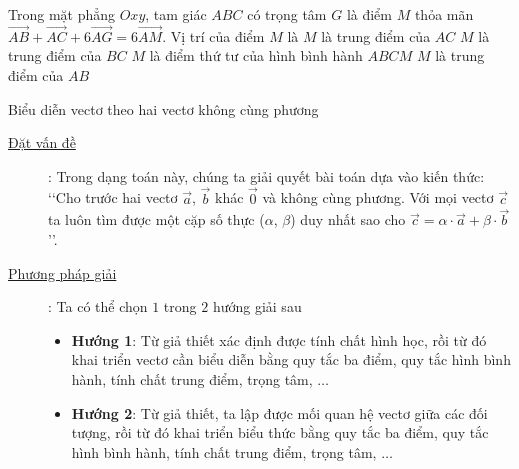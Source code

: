 \begin{ex}%
	Trong mặt phẳng $Oxy$, tam giác $ABC$ có trọng tâm $G$ là điểm $M$ thỏa mãn $\overrightarrow{AB}+\overrightarrow{AC}+6\overrightarrow{AG}=6\overrightarrow{AM}$. Vị trí của điểm $M$ là
	\choice
	{$M$ là trung điểm của $AC$}
	{\True $M$ là trung điểm của $BC$}
	{$M$ là điểm thứ tư của hình bình hành $ABCM$}
	{$M$ là trung điểm của $AB$}
\end{ex}





\begin{dang}{Biểu diễn vectơ theo hai vectơ không cùng phương}%
	\begin{description}
		\item[\underline{Đặt vấn đề}]: Trong dạng toán này, chúng ta giải quyết bài toán dựa vào kiến thức: \lq\lq  Cho trước hai vectơ $\overrightarrow{a}$, $\overrightarrow{b}$ khác $\overrightarrow{0}$ và không cùng phương. Với mọi vectơ $\overrightarrow{c}$ ta luôn tìm được một cặp số thực ($\alpha$, $\beta$) duy nhất sao cho $\overrightarrow{c}=\alpha\cdot \overrightarrow{a}+\beta\cdot \overrightarrow{b}$\rq\rq.
		\item[\underline{Phương pháp giải}]: Ta có thể chọn $1$ trong $2$ hướng giải sau
		      \begin{itemize}
			      \item \textbf{Hướng 1}: Từ giả thiết xác định được tính chất hình học, rồi từ đó khai triển vectơ cần biểu diễn bằng quy tắc ba điểm, quy tắc hình bình hành, tính chất trung điểm, trọng tâm, $\ldots$
			      \item \textbf{Hướng 2}: Từ giả thiết, ta lập được mối quan hệ vectơ giữa các đối tượng, rồi từ đó khai triển biểu thức bằng quy tắc ba điểm, quy tắc hình bình hành, tính chất trung điểm, trọng tâm, $\ldots$
		      \end{itemize}
	\end{description}
\end{dang}
